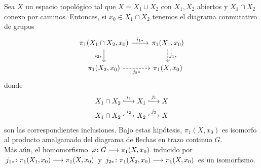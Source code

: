 \documentclass[GTSResumen.tex]{subfiles}
\begin{document}
\begin{teorema}\label{SVK} Sea $X$ un espacio topológico tal que $X=X_1\cup X_2$ con $X_1, X_2$ abiertos y $X_1\cap X_2$ conexo por caminos. Entonces, si $x_0\in X_1\cap X_2$ tenemos el diagrama conmutativo de grupos
\[
\begin{tikzcd}
\pi_1(X_1\cap X_2,x_0) \ar[r, "i_{1*}"]\arrow[d,"i_{2*} "'] & \pi_1(X_1,x_0)\ar[d,dashed,"j_{1*}"]\\
\pi_1(X_2,x_0)\ar[r,dashed,"{j_2}*"'] & \pi_1(X,x_0)
\end{tikzcd}
\]
donde
\begin{gather*}
X_1\cap X_2\overset{i_1}{\longhookarrow} X_1\overset{j_1}{\longhookarrow} X\\
X_1\cap X_2\overset{i_2}{\longhookarrow} X_2\overset{j_2}{\longhookarrow} X
\end{gather*}
son las correspondientes inclusiones. Bajo estas hipótesis, $\pi_1(X,x_0)$ es isomorfo al producto amalgamado del diagrama de flechas en trazo continuo  $G$.\\
Más aún, el homomorfismo $\varphi\colon{G}\longrightarrow{\pi_1(X,x_0)}$ inducido por $j_{1*}\colon{\pi_1(X_1,x_0)}\longrightarrow{\pi_1(X,x_0)}$ y $j_{2*}\colon{\pi_1(X_2,x_0)}\longrightarrow{\pi_1(X,x_0)}$ es un isomorfismo.
\end{teorema}

\end{document}
